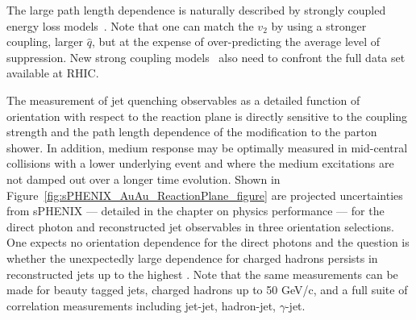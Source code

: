 
The large path length
dependence is naturally described by strongly coupled energy loss
models~\cite{Marquet:2009eq,Adare:2010sp}.  Note that one can match
the $v_2$ by using a stronger coupling, larger $\hat{q}$, but at the
expense of over-predicting the average level of suppression.  New
strong coupling
models~\cite{Casalderrey-Solana:2014wca,Casalderrey-Solana:2014bpa}
also need to confront the full data set available at RHIC.


The measurement of jet quenching observables as a detailed function of
orientation with respect to the reaction plane is directly sensitive
to the coupling strength and the path length dependence of the
modification to the parton shower.  In addition, medium response may
be optimally measured in mid-central collisions with a lower
underlying event and where the medium excitations are not damped out
over a longer time evolution.  Shown in
Figure~\ref{fig:sPHENIX_AuAu_ReactionPlane_figure} are projected
uncertainties from sPHENIX --- detailed in the chapter on physics
performance --- for the direct photon and reconstructed jet observables
in three orientation selections.  One expects no orientation
dependence for the direct photons and the question is whether the
unexpectedly large dependence for charged hadrons persists in
reconstructed jets up to the highest \pt.  Note that the same
measurements can be made for beauty tagged jets, charged hadrons up to
50 GeV/c, and a full suite of correlation measurements including
jet-jet, hadron-jet, $\gamma$-jet.

